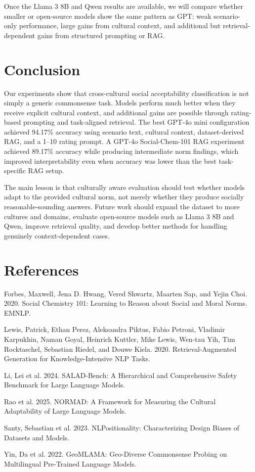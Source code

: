 \documentclass[11pt]{article}
\begin{document}
Once the Llama 3 8B and Qwen results are available, we will compare whether smaller or open-source models show the same pattern as GPT: weak scenario-only performance, large gains from cultural context, and additional but retrieval-dependent gains from structured prompting or RAG.

\section{Conclusion}

Our experiments show that cross-cultural social acceptability classification is not simply a generic commonsense task. Models perform much better when they receive explicit cultural context, and additional gains are possible through rating-based prompting and task-aligned retrieval. The best GPT-4o mini configuration achieved 94.17\% accuracy using scenario text, cultural context, dataset-derived RAG, and a 1--10 rating prompt. A GPT-4o Social-Chem-101 RAG experiment achieved 89.17\% accuracy while producing intermediate norm findings, which improved interpretability even when accuracy was lower than the best task-specific RAG setup.

The main lesson is that culturally aware evaluation should test whether models adapt to the provided cultural norm, not merely whether they produce socially reasonable-sounding answers. Future work should expand the dataset to more cultures and domains, evaluate open-source models such as Llama 3 8B and Qwen, improve retrieval quality, and develop better methods for handling genuinely context-dependent cases.

\section*{References}

Forbes, Maxwell, Jena D. Hwang, Vered Shwartz, Maarten Sap, and Yejin Choi. 2020. Social Chemistry 101: Learning to Reason about Social and Moral Norms. EMNLP.

Lewis, Patrick, Ethan Perez, Aleksandra Piktus, Fabio Petroni, Vladimir Karpukhin, Naman Goyal, Heinrich Kuttler, Mike Lewis, Wen-tau Yih, Tim Rocktaschel, Sebastian Riedel, and Douwe Kiela. 2020. Retrieval-Augmented Generation for Knowledge-Intensive NLP Tasks.

Li, Lei et al. 2024. SALAD-Bench: A Hierarchical and Comprehensive Safety Benchmark for Large Language Models.

Rao et al. 2025. NORMAD: A Framework for Measuring the Cultural Adaptability of Large Language Models.

Santy, Sebastian et al. 2023. NLPositionality: Characterizing Design Biases of Datasets and Models.

Yin, Da et al. 2022. GeoMLAMA: Geo-Diverse Commonsense Probing on Multilingual Pre-Trained Language Models.
\end{document}
